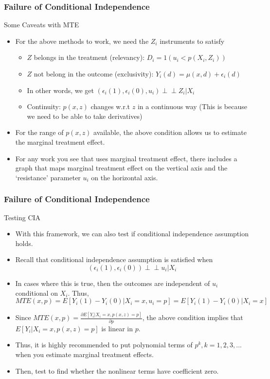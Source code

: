 \documentclass{beamer}
\begin{document}
\begin{frame}
\frametitle{Failure of Conditional Independence}
Some Caveats with MTE
\begin{itemize}
\item For the above methods to work, we need the $Z_i$ instruments to satisfy
\begin{itemize}
\item $Z$ belongs in the treatment (relevancy): $D_i=1(u_i<p(X_i,Z_i))$
\item $Z$ not belong in the outcome (exclusivity): $Y_i(d)=\mu(x,d)+\epsilon_i(d)$
\item In other words, we get $(\epsilon_i(1), \epsilon_i(0), u_i) \perp\!\!\!\perp Z_i|X_i$
\item Continuity: $p(x,z)$ changes w.r.t $z$ in a continuous way (This is because we need to be able to take derivatives)
\end{itemize}
\item For the range of $p(x,z)$ available, the above condition allows us to estimate the marginal treatment effect. 
\item For any work you see that uses marginal treatment effect, there includes a graph that maps marginal treatment effect on the vertical axis and the `resistance' parameter $u_i$ on the horizontal axis.
\end{itemize}
\end{frame}

\begin{frame}
\frametitle{Failure of Conditional Independence}
Testing CIA
\begin{itemize}
\item With this framework, we can also test if conditional independence assumption holds. 
\item Recall that conditional independence assumption is satisfied when
\[
(\epsilon_i(1),\epsilon_i(0)) \perp\!\!\!\perp u_i|X_i
\]
\item In cases where this is true, then the outcomes are independent of $u_i$ conditional on $X_i$. Thus, 
\[
MTE(x,p)=E[Y_i(1)-Y_i(0)|X_i=x, u_i=p]=E[Y_i(1)-Y_i(0)|X_i=x]
\]
\item Since $MTE(x,p)=\frac{\partial E[Y_i | X_i=x, p(x, z)=p]}{\partial p}$, the above condition implies that $E[Y_i|X_i=x, p(x, z)=p]$ is linear in $p$. 
\item Thus, it is highly recommended to put polynomial terms of $p^k, k=1,2,3,...$ when you estimate marginal treatment effects. \item Then, test to find whether the nonlinear terms have coefficient zero. 
\end{itemize}
\end{frame}
\end{document}
